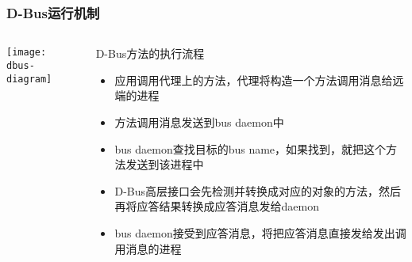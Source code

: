 \begin{frame}[fragile]
	\frametitle{D-Bus运行机制}
	
	\begin{columns}
		\begin{column}{.4\textwidth}
			
			\texttt{[image: dbus-diagram]}
			
		\end{column}
		\begin{column}{.6\textwidth}
			D-Bus方法的执行流程
			\begin{itemize}				
				\item 应用调用代理上的方法，代理将构造一个方法调用消息给远端的进程
				\item 方法调用消息发送到bus daemon中
				\item bus daemon查找目标的bus name，如果找到，就把这个方法发送到该进程中
				\item D-Bus高层接口会先检测并转换成对应的对象的方法，然后再将应答结果转换成应答消息发给daemon
				\item bus daemon接受到应答消息，将把应答消息直接发给发出调用消息的进程		
			\end{itemize}		
		\end{column}
	\end{columns}
\end{frame}

